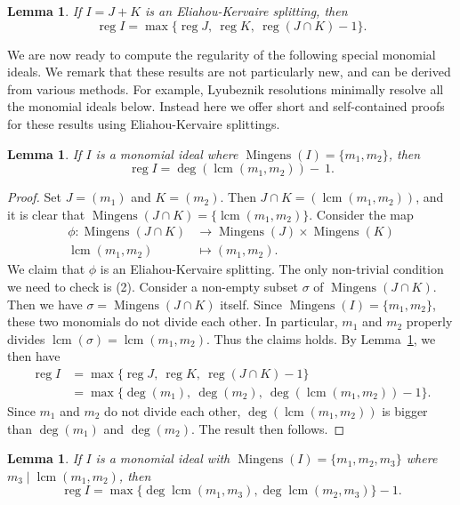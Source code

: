 \documentclass{amsart}
\newtheorem{lemma}[theorem]{Lemma}
\theoremstyle{remark}
\theoremstyle{definition}
\DeclareMathOperator{\reg}{reg}
\DeclareMathOperator{\lcm}{lcm}
\DeclareMathOperator{\mingens}{Mingens}
\begin{document}
	\begin{lemma}\label{lem:regularity-EK-splitting}
		If $I=J+K$ is an Eliahou-Kervaire splitting, then
		\[
		\reg I = \max \{\reg J, \ \reg K, \ \reg(J\cap K) -1 \}.
		\]
	\end{lemma}
	
	We are now ready to compute the regularity of the following special monomial ideals. We remark that these results are not particularly new, and can be derived from various methods. For example, Lyubeznik resolutions \cite{Ly88} minimally resolve all the monomial ideals below. Instead here we offer short and self-contained proofs for these results using Eliahou-Kervaire splittings.
	
	\begin{lemma}\label{lem:reg-2-gens}
		If $I$ is a monomial ideal where $\mingens(I)=\{m_1,m_2\}$, then 
        \[
        \reg I = \deg (\lcm(m_1,m_2)) -~1.
        \]
	\end{lemma}
	
	\begin{proof}
		Set $J=(m_1)$ and $K=(m_2)$. Then $J\cap K=(\lcm(m_1,m_2))$, and it is clear that $\mingens(J\cap K)=\{\lcm(m_1,m_2)\}$. Consider the map
		\begin{align*}
			\phi\colon \mingens(J\cap K) &\to \mingens(J)\times \mingens(K)\\
			\lcm(m_1,m_2) &\mapsto (m_1,m_2).
		\end{align*}
		We claim that $\phi$ is an Eliahou-Kervaire splitting. The only non-trivial condition we need to check is (2). Consider a non-empty subset $\sigma$ of $\mingens(J\cap K)$. Then we have $\sigma = \mingens(J\cap K)$ itself. Since $\mingens(I)=\{m_1,m_2\}$, these two monomials do not divide each other. In particular, $m_1$ and $m_2$ properly divides $\lcm(\sigma)=\lcm(m_1,m_2)$. Thus the claims holds. By Lemma~\ref{lem:regularity-EK-splitting}, we then have
		\begin{align*}
			\reg I &= \max \{\reg J, \ \reg K, \ \reg(J\cap K) -1 \}\\
			&= \max \{\deg(m_1), \ \deg(m_2), \ \deg(\lcm(m_1,m_2)) -1 \}.
		\end{align*}
		Since $m_1$ and $m_2$ do not divide each other, $\deg(\lcm(m_1,m_2))$ is bigger than $\deg(m_1)$ and $\deg(m_2)$. The result then follows.
	\end{proof}
	
	
	
	\begin{lemma}\label{lem:reg-3-gens}
		If $I$ is a monomial ideal with $\mingens(I)=\{m_1,m_2,m_3\}$ where $m_3\mid \lcm(m_1,m_2)$, then 
		\[
		\reg I = \max\{ \deg \lcm(m_1,m_3), \deg \lcm(m_2,m_3) \} -1.
		\]
	\end{lemma}
	
\end{document}
